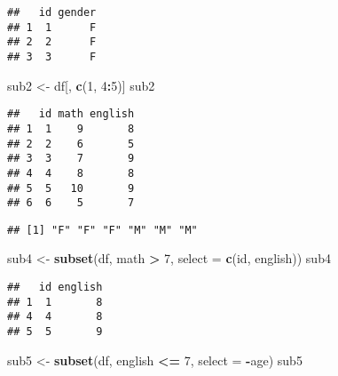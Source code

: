 \documentclass[
  a4paper,
]{article}
\newenvironment{Shaded}{\begin{snugshade}}{\end{snugshade}}
\newcommand{\AttributeTok}[1]{\textcolor[rgb]{0.13,0.29,0.53}{#1}}
\newcommand{\DecValTok}[1]{\textcolor[rgb]{0.00,0.00,0.81}{#1}}
\newcommand{\FunctionTok}[1]{\textcolor[rgb]{0.13,0.29,0.53}{\textbf{#1}}}
\newcommand{\NormalTok}[1]{#1}
\newcommand{\OtherTok}[1]{\textcolor[rgb]{0.56,0.35,0.01}{#1}}
\newcommand{\SpecialCharTok}[1]{\textcolor[rgb]{0.81,0.36,0.00}{\textbf{#1}}}
\begin{document}
\begin{verbatim}
##   id gender
## 1  1      F
## 2  2      F
## 3  3      F
\end{verbatim}

\begin{Shaded}
\begin{Highlighting}[]
\NormalTok{sub2 }\OtherTok{\textless{}{-}}\NormalTok{ df[, }\FunctionTok{c}\NormalTok{(}\DecValTok{1}\NormalTok{, }\DecValTok{4}\SpecialCharTok{:}\DecValTok{5}\NormalTok{)]}
\NormalTok{sub2}
\end{Highlighting}
\end{Shaded}

\begin{verbatim}
##   id math english
## 1  1    9       8
## 2  2    6       5
## 3  3    7       9
## 4  4    8       8
## 5  5   10       9
## 6  6    5       7
\end{verbatim}

\begin{Shaded}
\end{Shaded}

\begin{verbatim}
## [1] "F" "F" "F" "M" "M" "M"
\end{verbatim}

\begin{Shaded}
\begin{Highlighting}[]
\NormalTok{sub4 }\OtherTok{\textless{}{-}} \FunctionTok{subset}\NormalTok{(df, math }\SpecialCharTok{\textgreater{}} \DecValTok{7}\NormalTok{, }\AttributeTok{select =} \FunctionTok{c}\NormalTok{(id, english))}
\NormalTok{sub4}
\end{Highlighting}
\end{Shaded}

\begin{verbatim}
##   id english
## 1  1       8
## 4  4       8
## 5  5       9
\end{verbatim}

\begin{Shaded}
\begin{Highlighting}[]
\NormalTok{sub5 }\OtherTok{\textless{}{-}} \FunctionTok{subset}\NormalTok{(df, english }\SpecialCharTok{\textless{}=} \DecValTok{7}\NormalTok{, }\AttributeTok{select =} \SpecialCharTok{{-}}\NormalTok{age)}
\NormalTok{sub5}
\end{Highlighting}
\end{Shaded}
\end{document}

